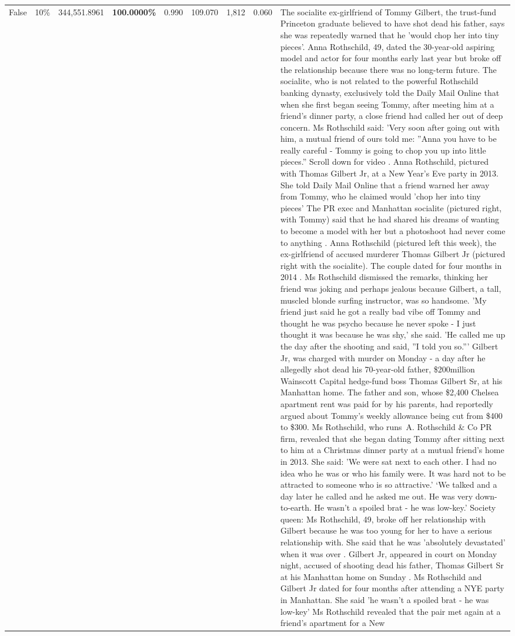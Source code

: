 \begin{table}[H]
\begin{tabular}{lllrlllll}
False & 10\% & 344,551.8961 & \bfseries \color{red} 100.0000\% & 0.990 & 109.070 & 1,812 & 0.060 & The socialite ex-girlfriend of Tommy Gilbert, the trust-fund Princeton graduate believed to have shot dead his father, says she was repeatedly warned that he 'would chop her into tiny pieces'. Anna Rothschild, 49, dated the 30-year-old aspiring model and actor for four months early last year but broke off the relationship because there was no long-term future. The socialite, who is not related to the powerful Rothschild banking dynasty, exclusively told the Daily Mail Online that when she first began seeing Tommy, after meeting him at a friend's dinner party, a close friend had called her out of deep concern. Ms Rothschild said: 'Very soon after going out with him, a mutual friend of ours told me: ''Anna you have to be really careful - Tommy is going to chop you up into little pieces.'' Scroll down for video . Anna Rothschild, pictured with Thomas Gilbert Jr, at a New Year's Eve party in 2013. She told Daily Mail Online that a friend warned her away from Tommy, who he claimed would 'chop her into tiny pieces' The PR exec and Manhattan socialite (pictured right, with Tommy) said that he had shared his dreams of wanting to become a model with her but a photoshoot had never come to anything . Anna Rothschild (pictured left this week), the ex-girlfriend of accused murderer Thomas Gilbert Jr (pictured right with the socialite). The couple dated for four months in 2014 . Ms Rothschild dismissed the remarks, thinking her friend was joking and perhaps jealous because Gilbert, a tall, muscled blonde surfing instructor, was so handsome. 'My friend just said he got a really bad vibe off Tommy and thought he was psycho because he never spoke - I just thought it was because he was shy,' she said. 'He called me up the day after the shooting and said, ''I told you so.''' Gilbert Jr, was charged with murder on Monday - a day after he allegedly shot dead his 70-year-old father, \$200million Wainscott Capital hedge-fund boss Thomas Gilbert Sr, at his Manhattan home. The father and son, whose \$2,400 Chelsea apartment rent was paid for by his parents, had reportedly argued about Tommy's weekly allowance being cut from \$400 to \$300. Ms Rothschild, who runs A. Rothschild \& Co PR firm, revealed that she began dating Tommy after sitting next to him at a Christmas dinner party at a mutual friend's home in 2013. She said: 'We were sat next to each other. I had no idea who he was or who his family were. It was hard not to be attracted to someone who is so attractive.' ‘We talked and a day later he called and he asked me out. He was very down-to-earth. He wasn’t a spoiled brat - he was low-key.’ Society queen: Ms Rothschild, 49, broke off her relationship with Gilbert because he was too young for her to have a serious relationship with. She said that he was 'absolutely devastated' when it was over . Gilbert Jr, appeared in court on Monday night, accused of shooting dead his father, Thomas Gilbert Sr at his Manhattan home on Sunday . Ms Rothschild and Gilbert Jr dated for four months after attending a NYE party in Manhattan. She said 'he wasn't a spoiled brat - he was low-key' Ms Rothschild revealed that the pair met again at a friend’s apartment for a New 
\end{tabular}
\end{table}
